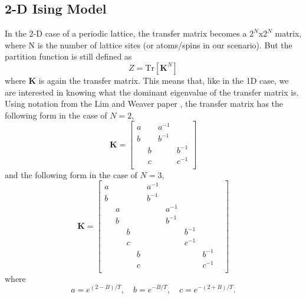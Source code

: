 \documentclass{article}
\newcommand{\be}{\begin{equation}}
\newcommand{\ee}{\end{equation}}
\newcommand{\tk}{\textbf{K}}
\begin{document}
\subsection{2-D Ising Model}
In the 2-D case of a periodic lattice, the transfer matrix becomes a $2^N$x$2^N$ matrix, where N is the number of lattice sites (or atoms/spins in our scenario).
But the partition function is still defined as
\be
  Z = \text{Tr}[ \tk^N ]
\ee
where \textbf{K} is again the transfer matrix.
This means that, like in the 1D case, we are interested in knowing what the dominant eigenvalue of the transfer matrix is.
Using notation from the Lim and Weaver paper \cite{lim_weare}, the transfer matrix has the following form in the case of $N = 2$,
\be
  \tk =
    \begin{bmatrix}
    a & & a^{-1} & \\
    b & & b^{-1} & \\
      & b & & b^{-1} \\
      & c & & c^{-1} \\
    \end{bmatrix}
\ee
and the following form in the case of $N = 3$,
\be
  \tk =
    \begin{bmatrix}
    a & & & & a^{-1} & & & & \\
    b & & & & b^{-1} & & & & \\
      & a & & & & a^{-1} & & & \\
      & b & & & & b^{-1} & & & \\
      &   & b & & & & b^{-1} & & \\
      &   & c & & & & c^{-1} & & \\
      &   &   & b & & & & b^{-1} & \\
      &   &   & c & & & & c^{-1} & \\
    \end{bmatrix}
\ee
where
\be
  a = e^{(2-B)/T} , \quad b = e^{-B/T} , \quad c = e^{-(2+B)/T} .
\ee



\end{document}
